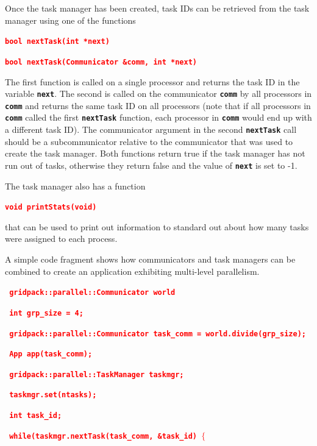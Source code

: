 \documentclass[12pt]{report} %
\begin{document}
Once the task manager has been created, task IDs can be retrieved from the task manager using one of the functions

\textcolor{red}{\texttt{\textbf{bool nextTask(int *next)}}}


\textcolor{red}{\texttt{\textbf{bool nextTask(Communicator \&comm, int *next)}}}

The first function is called on a single processor and returns the task ID in the variable \texttt{\textbf{next}}. The second is called on the communicator \texttt{\textbf{comm}} by all processors in \texttt{\textbf{comm}} and returns the same task ID on all processors (note that if all processors in \texttt{\textbf{comm}} called the first \texttt{\textbf{nextTask}} function, each processor in \texttt{\textbf{comm}} would end up with a different task ID). The communicator argument in the second \texttt{\textbf{nextTask}} call should be a subcommunicator relative to the communicator that was used to create the task manager. Both functions return true if the task manager has not run out of tasks, otherwise they return false and the value of \texttt{\textbf{next}} is set to -1.

The task manager also has a function

\textcolor{red}{\texttt{\textbf{void printStats(void)}}}

that can be used to print out information to standard out about how many tasks were assigned to each process.

A simple code fragment shows how communicators and task managers can be combined to create an application exhibiting multi-level parallelism.

\textcolor{red}{\texttt{\textbf{  gridpack::parallel::Communicator world}}}

\textcolor{red}{\texttt{\textbf{  int grp\_size = 4;}}}

\textcolor{red}{\texttt{\textbf{  gridpack::parallel::Communicator task\_comm = world.divide(grp\_size);}}}

\textcolor{red}{\texttt{\textbf{  App app(task\_comm);}}}

\textcolor{red}{\texttt{\textbf{  gridpack::parallel::TaskManager taskmgr;}}}

\textcolor{red}{\texttt{\textbf{  taskmgr.set(ntasks);}}}

\textcolor{red}{\texttt{\textbf{  int task\_id;}}}

\textcolor{red}{\texttt{\textbf{  while(taskmgr.nextTask(task\_comm, \&task\_id) $\boldsymbol{\mathrm{\{}}$}}}
\end{document}
